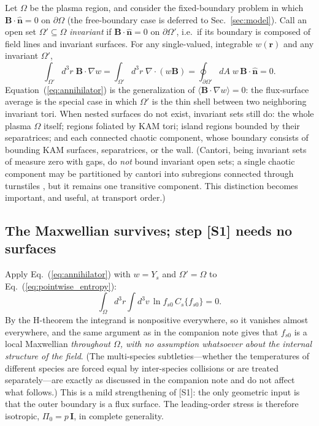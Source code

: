 \documentclass[english]{article}
\newcommand{\bB}{\mathbf{B}}
\newcommand{\br}{\mathbf{r}}
\newcommand{\bn}{\mathbf{n}}
\newcommand{\bI}{\mathbf{I}}
\begin{document}
Let $\Omega$ be the plasma region, and consider the fixed-boundary problem in which
$\bB\cdot\hat{\bn}=0$ on $\partial\Omega$ (the free-boundary case is deferred to
Sec.~\ref{sec:model}). Call an open set $\Omega'\subseteq\Omega$ \emph{invariant} if
$\bB\cdot\hat{\bn}=0$ on $\partial\Omega'$, i.e.\ if its boundary is composed of field lines and
invariant surfaces. For any single-valued, integrable $w(\br)$ and any invariant $\Omega'$,
\begin{equation}
\int_{\Omega'} d^3r\;\bB\cdot\nabla w
=\int_{\Omega'} d^3r\;\nabla\cdot(w\bB)
=\oint_{\partial\Omega'} dA\;w\,\bB\cdot\hat{\bn}=0 .
\label{eq:annihilator}
\end{equation}
Equation~(\ref{eq:annihilator}) is the generalization of $\langle\bB\cdot\nabla w\rangle=0$: the
flux-surface average is the special case in which $\Omega'$ is the thin shell between two
neighboring invariant tori. When nested surfaces do not exist, invariant sets still do: the whole
plasma $\Omega$ itself; regions foliated by KAM tori; island regions bounded by their separatrices;
and each connected chaotic component, whose boundary consists of bounding KAM surfaces, separatrices,
or the wall. (Cantori, being invariant sets of measure zero with gaps, do \emph{not} bound invariant
open sets; a single chaotic component may be partitioned by cantori into subregions connected
through turnstiles \cite{meiss1992}, but it remains one transitive component. This distinction
becomes important, and useful, at transport order.)

\subsection{The Maxwellian survives; step [S1] needs no surfaces}
\label{sec:maxwellian}

Apply Eq.~(\ref{eq:annihilator}) with $w=Y_s$ and $\Omega'=\Omega$ to
Eq.~(\ref{eq:pointwise_entropy}):
\begin{equation}
\int_\Omega d^3r\int d^3v\,\ln f_{s0}\,C_s\{f_{s0}\}=0 .
\end{equation}
By the H-theorem the integrand is nonpositive everywhere, so it vanishes almost everywhere, and the
same argument as in the companion note gives that $f_{s0}$ is a local Maxwellian
\emph{throughout $\Omega$, with no assumption whatsoever about the internal structure of the field}.
(The multi-species subtleties---whether the temperatures of different species are forced equal by
inter-species collisions or are treated separately---are exactly as discussed in the companion note
and do not affect what follows.) This is a mild strengthening of [S1]: the only geometric input is
that the outer boundary is a flux surface. The leading-order stress is therefore isotropic,
$\Pi_0=p\,\bI$, in complete generality.
\end{document}
